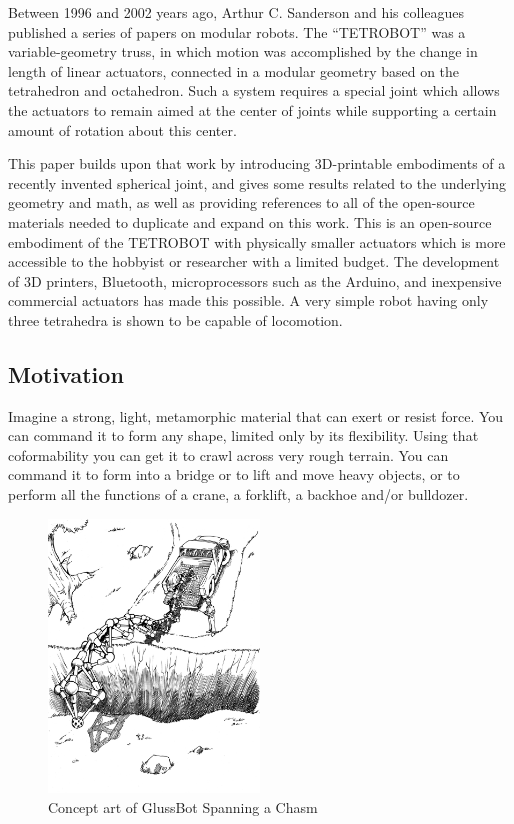 \documentclass[11pt]{article}
\begin{document}
Between 1996 and 2002 years ago, Arthur C. Sanderson and his colleagues published a series of
papers\cite{sanderson1996modular,lee2002dynamic,lee1999dynamics} on modular robots.
The ``TETROBOT'' was a variable-geometry truss, in which motion was accomplished by the change
in length of linear actuators, connected in a modular geometry based on the tetrahedron and octahedron.  Such a system
requires a special joint which allows the actuators to remain aimed at the center of joints while supporting
a certain amount of rotation about this center.


This paper builds upon that work by 
introducing 3D-printable embodiments of
a recently invented spherical joint\cite{song2003spherical}, 
and gives some results related to the underlying geometry and math, as well as providing
references to all of the open-source materials needed to duplicate and expand on this work. This is an
open-source embodiment of the TETROBOT with physically smaller actuators which is more accessible to the
hobbyist or researcher with a limited budget.  The development of 3D printers, Bluetooth, microprocessors
such as the Arduino, and inexpensive commercial actuators has made this possible.
A very simple robot having only three tetrahedra is shown to be capable of locomotion.

\subsection{Motivation}

Imagine a strong, light, metamorphic material that can exert or resist force.
You can command it to form any shape, limited only by its flexibility.
Using that coformability you can get it to crawl across very rough terrain.
You can command it to form into a bridge or to lift and move heavy objects,
or to perform all the functions of a crane, a forklift, a backhoe and/or bulldozer.

\begin{figure}[H]
  \centering
    \includegraphics[width=0.5\textwidth]{figures/robotTruckChasm.png}
    \caption[Concept art of GlussBot Spanning a Chasm]{Concept art of GlussBot Spanning a Chasm}
      \label{chasmspan}
\end{figure}
\end{document}

